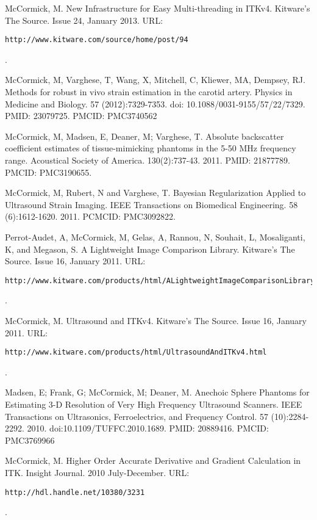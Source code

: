 \documentclass[margin,line]{res}
\begin{document}
\begin{resume}
McCormick, M.  New Infrastructure for Easy Multi-threading in ITKv4.  Kitware's
The Source.  Issue 24, January 2013.
\vspace*{-.25in}
URL: \begin{verbatim}http://www.kitware.com/source/home/post/94\end{verbatim}.
\vspace*{-.35in}

McCormick, M, Varghese, T, Wang, X, Mitchell, C, Kliewer, MA, Dempsey, RJ.
Methods for robust in vivo strain estimation in the carotid artery.
Physics in Medicine and Biology. 57 (2012):7329-7353.
doi: 10.1088/0031-9155/57/22/7329. PMID: 23079725. PMCID: PMC3740562

McCormick, M, Madsen, E, Deaner, M; Varghese, T.
Absolute backscatter coefficient estimates of tissue-mimicking phantoms in the
5-50 MHz frequency range.
Acoustical Society of America.  130(2):737-43.  2011.
PMID: 21877789.  PMCID: PMC3190655.

McCormick, M, Rubert, N and Varghese, T.  Bayesian Regularization Applied to
Ultrasound Strain Imaging.  IEEE Transactions on Biomedical Engineering.
58 (6):1612-1620.  2011.  PCMCID: PMC3092822.

Perrot-Audet, A, McCormick, M, Gelas, A, Rannou, N, Souhait, L, Mosaliganti, K,
and Megason, S.  A Lightweight Image Comparison Library.  Kitware's The Source.
Issue 16, January 2011.
\vspace*{-.25in}
URL: \begin{verbatim}http://www.kitware.com/products/html/ALightweightImageComparisonLibrary.html\end{verbatim}.
\vspace*{-.35in}

McCormick, M.  Ultrasound and ITKv4.  Kitware's The Source.  Issue 16, January
2011.
\vspace*{-.25in}
URL: \begin{verbatim}http://www.kitware.com/products/html/UltrasoundAndITKv4.html\end{verbatim}.
\vspace*{-.35in}

Madsen, E; Frank, G; McCormick, M; Deaner, M.  Anechoic Sphere Phantoms for
Estimating 3-D Resolution of Very High Frequency Ultrasound Scanners.
IEEE Transactions on Ultrasonics, Ferroelectrics, and Frequency Control. 57
(10):2284-2292. 2010.
doi:10.1109/TUFFC.2010.1689. PMID: 20889416. PMCID: PMC3769966

McCormick, M.  Higher Order Accurate Derivative and Gradient Calculation in ITK.
Insight Journal.  2010 July-December.
\vspace*{-.25in}
URL: \begin{verbatim}http://hdl.handle.net/10380/3231\end{verbatim}.
\vspace*{-.35in}


\end{resume}
\end{document}
